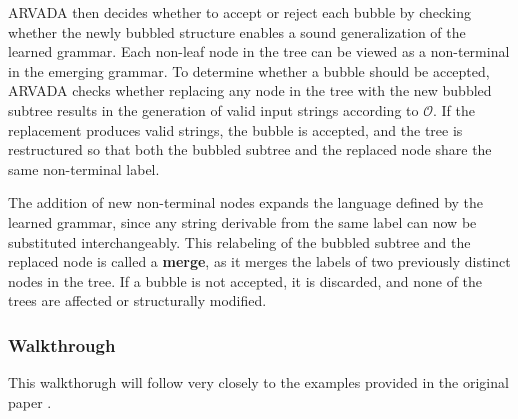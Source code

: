 \vspace{\baselineskip}
ARVADA then decides whether to accept or reject each bubble by checking whether the newly bubbled structure enables a sound generalization of the learned grammar. Each non-leaf node in the tree can be viewed as a non-terminal in the emerging grammar. To determine whether a bubble should be accepted, ARVADA checks whether replacing any node in the tree with the new bubbled subtree results in the generation of valid input strings according to $\mathcal{O}$. If the replacement produces valid strings, the bubble is accepted, and the tree is restructured so that both the bubbled subtree and the replaced node share the same non-terminal label.

\vspace{\baselineskip}
The addition of new non-terminal nodes expands the language defined by the learned grammar, since any string derivable from the same label can now be substituted interchangeably. This relabeling of the bubbled subtree and the replaced node is called a \textbf{merge}, as it merges the labels of two previously distinct nodes in the tree. If a bubble is not accepted, it is discarded, and none of the trees are affected or structurally modified.

\subsubsection{Walkthrough}

This walkthorugh will follow very closely to the examples provided in the original paper \cite{kulkarniLearningHighlyRecursive2021}. 

